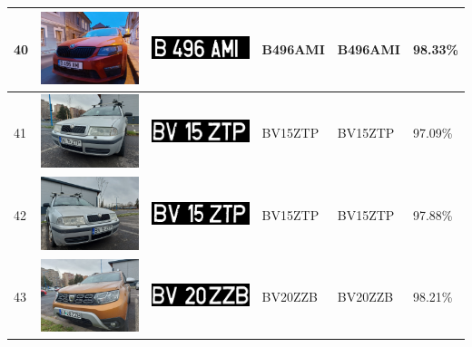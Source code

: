 \documentclass[a4paper,12pt]{report}
\begin{document}
\begin{longtable}{| m{0.6cm} | m{3cm} | m{3cm} | m{1.8cm} | m{1.8cm} | m{1.8cm} |}
    40  & \includegraphics[width=3cm,keepaspectratio]{dataset/23_d1.jpg}  & \includegraphics[width=3cm,keepaspectratio]{segmentari/40.jpg}  & B496AMI             & B496AMI              & 98.33\%    \\ \hline
    41  & \includegraphics[width=3cm,keepaspectratio]{dataset/24_d1.jpg}  & \includegraphics[width=3cm,keepaspectratio]{segmentari/41.jpg}  & BV15ZTP             & BV15ZTP              & 97.09\%    \\ \hline
    42  & \includegraphics[width=3cm,keepaspectratio]{dataset/24_s1.jpg}  & \includegraphics[width=3cm,keepaspectratio]{segmentari/42.jpg}  & BV15ZTP             & BV15ZTP              & 97.88\%    \\ \hline
    43  & \includegraphics[width=3cm,keepaspectratio]{dataset/25_d1.jpg}  & \includegraphics[width=3cm,keepaspectratio]{segmentari/43.jpg}  & BV20ZZB             & BV20ZZB              & 98.21\%    \\ \hline

\end{longtable}
\end{document}
